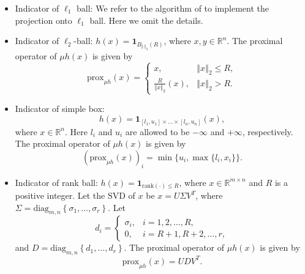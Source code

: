 \documentclass[a4paper]{article}
\newcommand{\norm}[1]{\left\Vert#1\right\Vert}
\newcommand{\mr}{\mathbb{R}}
\newcommand{\prox}{\mathrm{prox}}
\newcommand{\mi}{\mathbf{1}}
\newcommand{\diag}{\mathrm{diag}}
\newcommand{\rank}{\mathrm{rank}}
\begin{document}
\begin{itemize}
    \item {Indicator of $\ell_1$ ball:} We refer to the algorithm of 
    \cite{l1ball} to implement the projection onto $\ell_1$ ball. 
    Here we omit the details. 
    
    \item {Indicator of $\ell_2$-ball:} $h(x) = 
    \mi_{ B_{\norm{\cdot}_2}(R)}$, where $x, y \in \mr^n$.
    The proximal operator of $\mu h(x)$ is given by
    \begin{displaymath}
      \prox_{\mu h}(x) = 
      \begin{cases}
        x, & \norm{x}_2 \le R, \\
        \frac{R}{\norm{x}_2}(x), & \norm{x}_2 > R.
      \end{cases}
    \end{displaymath}
    
    \item {Indicator of simple box:} $$h(x) = \mi_{[l_1,u_1] \times 
      \ldots \times [l_n,u_n]}(x),$$
    where $x \in \mr^n$. Here $l_i$ and $u_i$ are allowed to be 
    $-\infty$ and $+\infty$, respectively. The proximal operator of 
    $\mu h(x)$ is given by
    \begin{displaymath}
      (\prox_{\mu h}(x))_i = \min\{ u_i, \max\{l_i, x_i\} \}.
    \end{displaymath}
    
    \item {Indicator of rank ball:} $h(x) = \mi_{\rank(\cdot) \le 
      R}$, 
    where $x \in \mr^{m \times n}$ and $R$ is a positive integer. Let 
    the SVD of $x$ be $x = U \Sigma V^T$, where $\Sigma = 
    \diag_{m,n}\left\{ \sigma_1, \ldots, \sigma_r \right\}$. Let 
    \begin{displaymath}
      d_i = 
      \begin{cases}
        \sigma_i, & i = 1, 2, \ldots, R, \\
        0, & i = R+1, R+2, \ldots, r,
      \end{cases}
    \end{displaymath}
    and $D = \diag_{m,n}\left\{ d_1, \ldots, d_r \right\}$.
    The proximal operator of $\mu h(x)$ is given by
    \begin{displaymath}
      \prox_{\mu h}(x) = U D V^T.
    \end{displaymath}
    
  \end{itemize}
  
  
  
  
  
\end{document}
